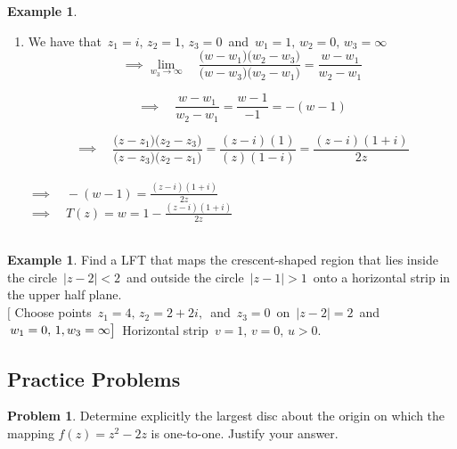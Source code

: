 \documentclass[11pt,a4paper]{article}
\theoremstyle{definition}
\newtheorem{example}[thm]{Example}
\newtheorem{problemx}{Problem}[section]
\newenvironment{problem}{\begin{problemx}}{\end{problemx}}
\begin{document}
\begin{example}
\begin{enumerate}
\item[(b).] We have that $\, z_1 = i, \, z_2 = 1, \, z_3 = 0\,$ and $\, w_1 = 1, \, w_2 = 0, \, w_3 = \infty$
$$\implies \lim\limits_{w_3\rightarrow \infty}\quad \frac{\big(w - w_1\big)\big(w_2 - w_3\big)}{\big(w - w_3\big)\big(w_2 - w_1\big)} = \frac{w - w_1}{w_2 - w_1}$$


$$\implies \quad  \frac{w - w_1}{w_2 - w_1} = \frac{w - 1}{-1} = -(w- 1)$$


$$\implies \quad \frac{\big(z - z_1\big)\big(z_2 - z_3\big)}{\big(z - z_3\big)\big(z_2 - z_1\big)} = \frac{(z - i)(1)}{(z)(1-i)} = \frac{(z - i)(1 + i)}{2z}$$\\


$\implies \quad  -(w - 1)= \frac{(z - i)(1  + i)}{2z}$\\


$\implies \quad  T(z) = w = 1 - \frac{(z - i)(1 + i)}{2z}$\\\\
\end{enumerate}
\end{example}

\begin{example}
Find a LFT that maps the crescent-shaped region that lies inside the circle $\, \left|z - 2\right| < 2\,$  and outside the circle $\, \left|z - 1\right| > 1\,$ onto a horizontal strip in the upper half plane.\\
$\big[$ Choose points $\, z_1 = 4, \, z_2 = 2 + 2i, \,$ and $\, z_3 = 0\,$ on $\,\left|z - 2\right| = 2\,$ and $\, w_1  = 0, \, 1, \,\\ w_3 = \infty\big]\,$ Horizontal strip $\, v = 1, \, v = 0, \, u>0$.
\end{example}

{\color[wave]{485}\subsection{Practice Problems}}

\begin{problem}
Determine explicitly the largest disc about the origin on which the mapping
$f(z) = z^{2} - 2z$ is one-to-one. Justify your answer.
\end{problem}
\end{document}
